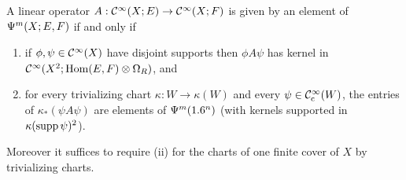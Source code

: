 \begin{theorem}\label{manifolds:thm:local}
A linear operator $A:\mathcal{C}^\infty(X;E)\to\mathcal{C}^\infty(X;F)$ is given by an element of
$\Psi^{m}(X;E,F)$ if and only if
\begin{enumerate}[label=\textup{(\roman*)}]
\item if $\phi,\psi\in\mathcal{C}^\infty(X)$ have disjoint supports then $\phi A\psi$ has
kernel in $\mathcal{C}^\infty(X^2;\operatorname{Hom}(E,F)\otimes\Omega_R)$, and
\item for every trivializing chart $\kappa:W\to\kappa(W)$ and every
$\psi\in\mathcal{C}^\infty_{\mathrm{c}}(W)$, the entries of $\kappa_*(\psi A\psi)$ are elements of
$\Psi^{m}(1.6^n)$ (with kernels supported in $\kappa(\operatorname{supp}\psi)^2$).
\end{enumerate}
Moreover it suffices to require \textup{(ii)} for the charts of one finite cover
of $X$ by trivializing charts.
\end{theorem}
